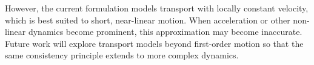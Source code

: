 \documentclass[runningheads]{llncs}
\begin{document}
However, the current formulation models transport with locally constant velocity, which is best suited to short, near-linear motion. 
When acceleration or other non-linear dynamics become prominent, this approximation may become inaccurate. 
Future work will explore transport models beyond first-order motion so that the same consistency principle extends to more complex dynamics. 



%
%


\end{document}

